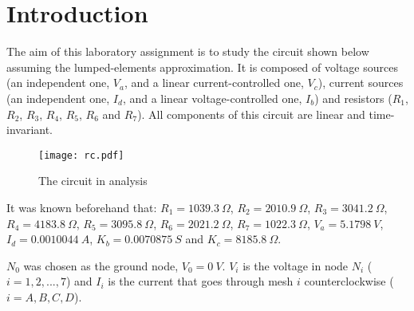 \section{Introduction}
\label{sec:introduction}

\par
The aim of this laboratory assignment is to study the circuit shown below assuming the lumped-elements approximation. It is composed of voltage sources (an independent one, $V_a$, and a linear current-controlled one, $V_c$), current sources (an independent one, $I_d$, and a linear voltage-controlled one, $I_b$) and resistors ($R_1$, $R_2$, $R_3$, $R_4$, $R_5$, $R_6$ and $R_7$). All components of this circuit are linear and time-invariant.

\begin{figure}[h] \centering
\texttt{[image: rc.pdf]}
\caption{The circuit in analysis}
\label{fig:rc}
\end{figure}

\par
It was known beforehand that:
$R_1 = 1039.3 \ \Omega$,
$R_2 = 2010.9 \ \Omega$,
$R_3 = 3041.2 \ \Omega$,
$R_4 = 4183.8 \ \Omega$,
$R_5 = 3095.8 \ \Omega$,
$R_6 = 2021.2 \ \Omega$,
$R_7 = 1022.3 \ \Omega$,
$V_a = 5.1798 \ V$,
$I_d = 0.0010044 \ A$,
$K_b = 0.0070875 \ S$ and
$K_c = 8185.8 \ \Omega$.


\par
$N_0$ was chosen as the ground node, $V_0 = 0 \ V$. $V_i$ is the voltage in node $N_i$ ($i=1, 2, ..., 7$) and $I_i$  is the current that goes through mesh $i$ counterclockwise ($i=A, B, C, D$).

